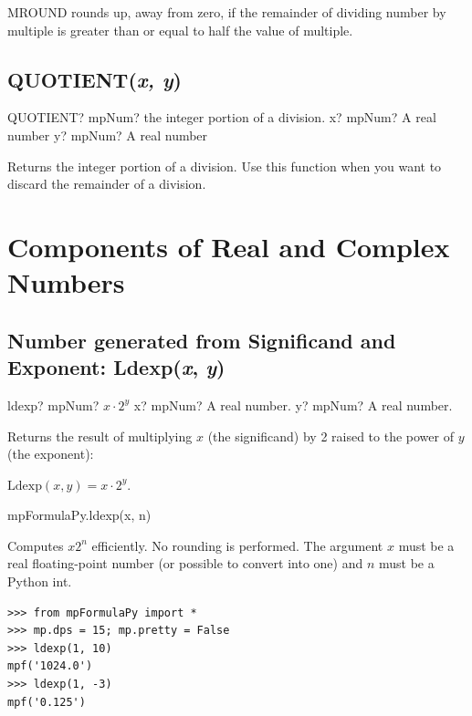 \vspace{0.3cm}
MROUND rounds up, away from zero, if the remainder of dividing number by multiple is greater than or equal to half the value of multiple.




\subsection{QUOTIENT(\textit{x, y})}

\begin{mpFunctionsExtract}
	\mpWorksheetFunctionTwoNotImplemented
	{QUOTIENT? mpNum? the integer portion of a division.}
	{x? mpNum? A real number}
	{y? mpNum? A real number}
\end{mpFunctionsExtract}


\vspace{0.3cm}
Returns the integer portion of a division. Use this function when you want to discard the remainder of a division.





\newpage
\section{Components of Real and Complex Numbers}


\subsection{Number generated from Significand and Exponent: Ldexp(\textit{x}, \textit{y})}

\begin{mpFunctionsExtract}
	\mpFunctionTwo
	{ldexp? mpNum? $x \cdot 2^{y}$}
	{x? mpNum? A real number.}
	{y? mpNum? A real number.}
\end{mpFunctionsExtract}

\vspace{0.3cm}
Returns the result of multiplying $x$ (the significand) by 2 raised to the power of $y$ (the exponent): 

$\text{Ldexp}(x,y) = x \cdot 2^{y}$.



mpFormulaPy.ldexp(x, n)

\vpara
Computes $x2^n$ efficiently. No rounding is performed. The argument $x$ must be a real floating-point number (or possible to convert into one) and $n$ must be a Python int.

\begin{lstlisting}
>>> from mpFormulaPy import *
>>> mp.dps = 15; mp.pretty = False
>>> ldexp(1, 10)
mpf('1024.0')
>>> ldexp(1, -3)
mpf('0.125')
\end{lstlisting}


